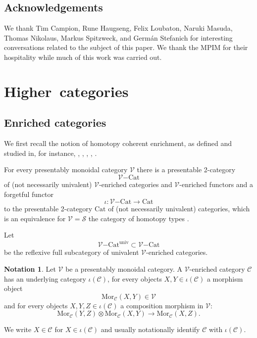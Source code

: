 \documentclass[10pt,oneside]{article}
\numberwithin{equation}{section} %
\numberwithin{figure}{section} %
\theoremstyle{plain}
\theoremstyle{definition}
\newtheorem{notation}[theorem]{Notation}
\newcommand{\mC}{{\mathcal C}}
\newcommand{\mS}{{\mathcal S}}
\newcommand{\mV}{{\mathcal V}}
\newcommand{\X}{X}
\newcommand{\ot}{\otimes}
\newcommand{\univ}{\mathrm{univ}}
\newcommand{\Cat}{\mathrm{Cat}}
\newcommand{\Mor}{{\mathrm{Mor}}}
\begin{document}
\subsection*{Acknowledgements}
We thank Tim Campion, Rune Haugseng, Felix Loubaton, Naruki Masuda, Thomas Nikolaus, Markus Spitzweck, and Germ\'an Stefanich for interesting conversations related to the subject of this paper.
We thank the MPIM for their hospitality while much of this work was carried out.

\vspace{.25cm}

\section{\mbox{Higher categories}}

\subsection{Enriched categories}

We first recall the notion of homotopy coherent enrichment, as defined and studied in, for instance, \cite{MR3345192}, \cite{HEINE2023108941}, \cite{heine2024higher}, \cite{heine2025equivalence}, \cite{HINICH2020107129}.



For every presentably monoidal category $\mV$ there is a presentable 2-category $${\mV\mathrm{-}\Cat}$$ of (not necessarily univalent) $\mV$-enriched categories and $\mV$-enriched functors and a forgetful functor $$ \iota:{\mV\mathrm{-}\Cat} \to \Cat$$ to the presentable 2-category $\Cat$ of (not necessarily univalent) categories,
which is an equivalence for $\mV= \mS$ the category of homotopy types \cite[Corollary 3.23.]{heine2024bienriched}. 

Let $${\mV\mathrm{-}\Cat}^\univ \subset {\mV\mathrm{-}\Cat}$$ be the reflexive full subcategory of univalent $\mV$-enriched categories.



\begin{notation}Let $\mV$ be a presentably monoidal category.
A $\mV$-enriched category $\mC$ has an underlying category $\iota(\mC)$, for every objects $X,Y \in \iota(\mC)$ a morphism object 
$$\Mor_\mC(X, Y) \in \mV$$
and for every objects $X,Y,Z \in \iota(\mC)$ a composition morphism in $\mV:$
$$\Mor_\mC(Y, Z) \ot \Mor_\mC(X, Y) \to \Mor_\mC(X, Z).$$

We write $\X \in \mC$ for $\X \in \iota(\mC)$ and usually notationally identify $\mC$ with $\iota(\mC).$


	
\end{notation}
\end{document}
